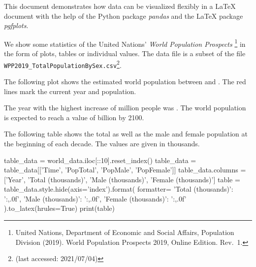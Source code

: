 \documentclass{article}
\begin{document}
This document demonstrates how data can be visualized flexibly in a \LaTeX{}
document with the help of the Python package \emph{pandas} and the \LaTeX{}
package \emph{pgfplots}.

We show some statistics of the United Nations' \emph{World Population Prospects}%
\footnote{United Nations, Department of Economic and Social Affairs, Population
Division (2019). World Population Prospects 2019, Online Edition. Rev.\ 1.} in the
form of plots, tables or individual values.
The data file \texttt{} is a subset of the file
\texttt{WPP2019\_TotalPopulationBySex.csv}\footnote{\dataurl{} (last accessed:
2021/07/04)}.

The following plot shows the estimated world population between 
and . The red lines mark the current year and population.

\begin{center}
\end{center}

The year with the highest increase of  million people
was . The world population is expected to reach a value
of  billion by 2100.

The following table shows the total as well as the male and female population at
the beginning of each decade. The values are given in thousands.
\begin{center}
\begin{python}
table_data = world_data.iloc[::10].reset_index()
table_data = table_data[['Time', 'PopTotal', 'PopMale', 'PopFemale']]
table_data.columns = ['Year', 'Total (thousands)', 'Male (thousands)', 'Female (thousands)']
table = table_data.style.hide(axis='index').format(
  formatter={
    'Total (thousands)': '{:,.0f}',
    'Male (thousands)': '{:,.0f}',
    'Female (thousands)': '{:,.0f}'
  }
).to_latex(hrules=True)
print(table)
\end{python}
\end{center}
\end{document}
